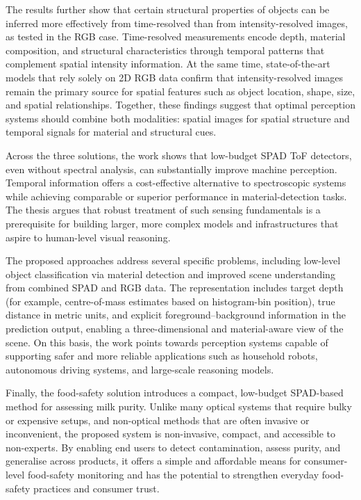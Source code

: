 \documentclass[12pt,a4paper,oneside]{report}
\begin{document}
The results further show that certain structural properties of objects can be inferred more effectively from time-resolved than from intensity-resolved images, as tested in the RGB case. Time-resolved measurements encode depth, material composition, and structural characteristics through temporal patterns that complement spatial intensity information. At the same time, state-of-the-art models that rely solely on 2D RGB data confirm that intensity-resolved images remain the primary source for spatial features such as object location, shape, size, and spatial relationships. Together, these findings suggest that optimal perception systems should combine both modalities: spatial images for spatial structure and temporal signals for material and structural cues.

Across the three solutions, the work shows that low-budget SPAD ToF detectors, even without spectral analysis, can substantially improve machine perception. Temporal information offers a cost-effective alternative to spectroscopic systems while achieving comparable or superior performance in material-detection tasks. The thesis argues that robust treatment of such sensing fundamentals is a prerequisite for building larger, more complex models and infrastructures that aspire to human-level visual reasoning.

The proposed approaches address several specific problems, including low-level object classification via material detection and improved scene understanding from combined SPAD and RGB data. The representation includes target depth (for example, centre-of-mass estimates based on histogram-bin position), true distance in metric units, and explicit foreground–background information in the prediction output, enabling a three-dimensional and material-aware view of the scene. On this basis, the work points towards perception systems capable of supporting safer and more reliable applications such as household robots, autonomous driving systems, and large-scale reasoning models.

Finally, the food-safety solution introduces a compact, low-budget SPAD-based method for assessing milk purity. Unlike many optical systems that require bulky or expensive setups, and non-optical methods that are often invasive or inconvenient, the proposed system is non-invasive, compact, and accessible to non-experts. By enabling end users to detect contamination, assess purity, and generalise across products, it offers a simple and affordable means for consumer-level food-safety monitoring and has the potential to strengthen everyday food-safety practices and consumer trust.
\end{document}
